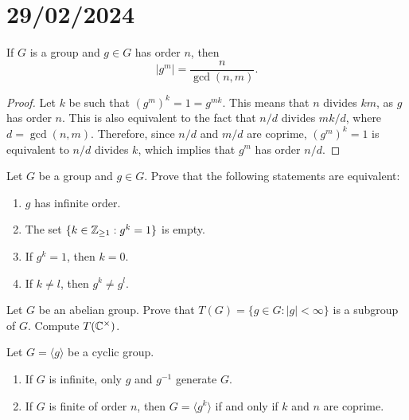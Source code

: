 \section{29/02/2024}

\begin{corollary}
        If $G$ is a group and $g\in G$ has order $n$, 
        then 
        \[
        |g^m|=\frac{n}{\gcd(n,m)}.
        \]
        \end{corollary}
        
\begin{proof}
        Let $k$ be such that $(g^m)^k=1=g^{mk}$. This means that $n$ divides $km$, as $g$ 
        has order $n$. This is also equivalent to the fact that 
        $n/d$ divides $mk/d$, where $d=\gcd(n,m)$. Therefore, since $n/d$ and $m/d$ 
        are coprime, $(g^m)^k=1$ is equivalent to  
        $n/d$ divides $k$, which implies that $g^m$ has order $n/
        d$.
\end{proof}
        
\begin{exercise}
        Let $G$ be a group and $g\in G$. Prove that the following statements are equivalent:
        \begin{enumerate}
        \item $g$ has infinite order. 
        \item The set $\{k\in\mathbb{Z}_{\geq1}:g^k=1\}$ is empty.
        \item If $g^k=1$, then $k=0$.
        \item If $k\ne l$, then $g^k\ne g^l$.
        \end{enumerate}
\end{exercise}

\begin{exercise}
        Let $G$ be an abelian group. Prove that 
        $T(G)=\{g\in G:|g|<\infty\}$ is a subgroup of $G$. Compute $T(\mathbb{C}^\times)$.
\end{exercise}
                
\begin{exercise}
        Let $G=\langle g\rangle$ be a cyclic group. 
        \begin{enumerate}
                \item If $G$ is infinite, only $g$ and $g^{-1}$ generate $G$.
                \item If $G$ is finite of order $n$, then 
                        $G=\langle g^k\rangle$ if and only if $k$ and $n$ are coprime.
        \end{enumerate}
\end{exercise}
                
